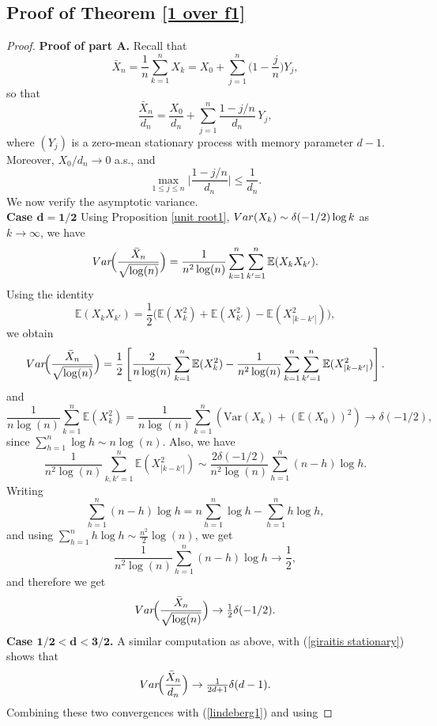 \documentclass[10pt,a4paper]{amsart}
\numberwithin{equation}{section}
\newcommand{\Var}{{\rm Var}}
\begin{document}
\subsection{Proof of Theorem \ref{1 over f1}}
\begin{proof}
\noindent\textbf{Proof of part A.}
Recall that
\[
\bar X_n=\frac1n\sum_{k=1}^n X_k
=X_0+\sum_{j=1}^n\Big(1-\frac{j}{n}\Big)Y_j,
\]
so that
\[
\frac{\bar X_n}{d_n}
=\frac{X_0}{d_n}+\sum_{j=1}^n \frac{1-j/n}{d_n}\,Y_j,
\]
where $(Y_j)$ is a zero-mean stationary process with memory parameter $d-1.$ Moreover, $X_0/d_n\to0$ a.s., and
\begin{equation}\label{lindeberg1}
\max_{1\le j\le n}\Big|\frac{1-j/n}{d_n}\Big|
\le \frac{1}{d_n}.
\end{equation}
We now verify the asymptotic variance.\\
{\bf Case $\mathbf{d=1/2}$}
Using Proposition \ref{unit root1},   $\Var(X_k)\sim \delta(-1/2)\log k$ as $k\to\infty$, we have
\[
\Var\!\Big(\frac{\bar X_n}{\sqrt{\log(n)}}\Big)
=\frac{1}{n^2\log(n)}\sum_{k=1}^n\sum_{k'=1}^n \mathbb E(X_kX_{k'}).
\]
Using the identity
\[
\mathbb E(X_kX_{k'})
=\frac12\bigl(\mathbb E(X_k^2)+\mathbb E(X_{k'}^2)
-\mathbb E(X_{|k-k'|}^2)\bigr),
\]
we obtain
\[
\Var\!\Big(\frac{\bar X_n}{\sqrt{\log(n)}}\Big)
=\frac12\left[
\frac{2}{n\log(n)}\sum_{k=1}^n \mathbb E(X_k^2)
-\frac{1}{n^2\log(n)}\sum_{k=1}^n\sum_{k'=1}^n \mathbb E(X_{|k-k'|}^2)
\right].
\]
and
\begin{equation}\label{var log n}
\frac{1}{n\log(n)}\sum_{k=1}^n \mathbb E(X_k^2)=\frac{1}{n\log(n)}\sum_{k=1}^n\left(\textrm{Var}(X_k)+(\mathbb{E}(X_0))^2\right)\to \delta(-1/2),
\end{equation}
since $\sum_{h=1}^n \log h\sim n\log(n)$.
Also, we have
\[
\frac{1}{n^2\log(n)}\sum_{k,k'=1}^n \mathbb E(X_{|k-k'|}^2)
\sim \frac{2\delta(-1/2)}{n^2\log(n)}\sum_{h=1}^{n}(n-h)\log h.
\]
Writing
\[
\sum_{h=1}^{n}(n-h)\log h
=
n\sum_{h=1}^n \log h-\sum_{h=1}^n h\log h,
\]
and using  
$\sum_{h=1}^n h\log h\sim \frac{n^2}{2}\log(n)$, we get
\[
\frac{1}{n^2\log(n)}\sum_{h=1}^{n}(n-h)\log h \to \frac12,
\]
and therefore we get
\begin{equation}\label{1/2 variance}
\Var\!\Big(\frac{\bar X_n}{\sqrt{\log(n)}}\Big)\to \tfrac12\delta(-1/2).
\end{equation}
{\bf Case $\mathbf{1/2<d<3/2}$.} A similar  computation as above, with (\ref{giraitis stationary}) shows that
$$
\Var\!\Big(\frac{\bar X_n}{d_n}\Big)\to \tfrac1{2d+1}\delta(d-1).
$$
Combining these two convergences  with  (\ref{lindeberg1}) and using 

\end{proof}
\end{document}
